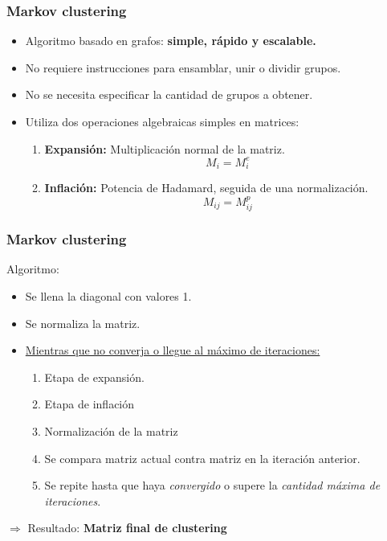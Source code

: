 \begin{frame}[t,fragile]
\frametitle {Markov clustering}
\begin{itemize}
	\item Algoritmo basado en grafos: \textbf{simple, rápido y escalable.}
	\vspace{2mm}
	\item No requiere instrucciones para ensamblar, unir o dividir grupos.
	\vspace{2mm}
	\item No se necesita especificar la cantidad de grupos a obtener.
	\vspace{2mm}
	\item Utiliza dos operaciones algebraicas simples en matrices:
	\vspace{2mm}
	\begin{enumerate}
		\item \textbf{Expansión:} Multiplicación normal de la matriz. $$M_i = M_i ^ e$$
		\item \textbf{Inflación:} Potencia de Hadamard, seguida de una normalización. $$M_{ij} = M_{ij}^p$$
	\end{enumerate}
\end{itemize}
\end{frame}
\begin{frame}[t,fragile]
\frametitle {Markov clustering}
Algoritmo: 
\begin{itemize}
	\item Se llena la diagonal con valores 1.
	\vspace{2mm}
	\item Se normaliza la matriz.
	\vspace{2mm}
	\item \underline{Mientras que no converja o llegue al máximo de iteraciones:}
	\vspace{2mm}
	\begin{enumerate}
		\item Etapa de expansión.
		\vspace{2mm}
		\item Etapa de inflación
		\vspace{2mm}
		\item Normalización de la matriz
		\vspace{2mm}
		\item Se compara matriz actual contra matriz en la iteración anterior.
		\vspace{2mm}
		\item Se repite hasta que haya \textit{convergido} o supere la \textit{cantidad máxima de iteraciones}.
	\end{enumerate}
\end{itemize}

\begin{center}
		$\Rightarrow$ Resultado: \textbf{Matriz final de clustering}
\end{center}
\end{frame}
